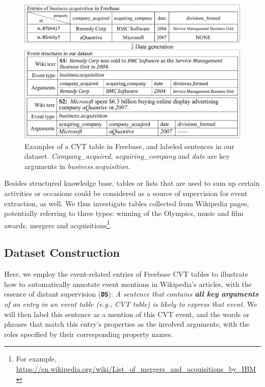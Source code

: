 \begin{figure}[h]
	\centering
	\includegraphics[width=.48\textwidth]{temp_figure1.png}
	\caption{Examples of a CVT table in Freebase, and labeled sentences in our dataset. \emph{Company\_acquired}, \emph{acquiring\_company} and \emph{date} are key arguments in \emph{business.acquisition}. \label{fig:3}}
\end{figure}

Besides structured knowledge base, tables or lists that are used to sum up certain activities or occasions could be considered as a source of supervision for event extraction, as well. 
We thus investigate tables collected from Wikipedia pages, potentially referring to three types: winning of the Olympics, music and film awards, mergers and acquisitions\footnote{For example, \url{https://en.wikipedia.org/wiki/List_of_mergers_and_acquisitions_by_IBM}}.

\subsection{Dataset Construction\label{datagen}} 
Here, we employ the event-related entries of Freebase CVT tables to illustrate how to automatically annotate event mentions in Wikipedia's articles, with the essence of distant supervision (\textbf{\texttt{DS}}): \textit{A sentence that contains \textbf{all key arguments} of an entry in an event table (e.g., CVT table) is likely to express that event}.
We will then label this sentence as a mention of this CVT event, and the words or phrases that match this entry's properties as the involved arguments, with the roles specified by their corresponding property names. 

